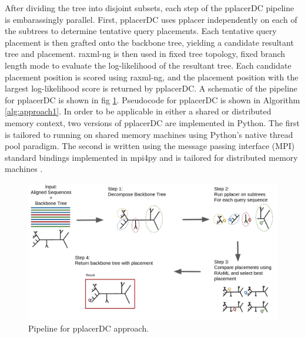\documentclass[10pt]{article}
\begin{document}
After dividing the tree into disjoint subsets, each step of the pplacerDC pipeline
is embarassingly parallel.
First, pplacerDC uses pplacer independently on each of the subtrees to determine tentative
query placements.
Each tentative query placement is then grafted onto the backbone tree, yielding a candidate
resultant tree and placement.
raxml-ng \cite{raxml} is then used in fixed tree topology, fixed branch length mode to evaluate
the log-likelihood of the resultant tree.
Each candidate placement position is scored using raxml-ng, and the placement position
with the largest log-likelihood score is returned by pplacerDC.
A schematic of the pipeline for pplacerDC is shown in fig \ref{fig:pplacerDC-pipeline}.
Pseudocode for pplacerDC is shown in Algorithm \ref{alg:approach1}.
In order to be applicable in either a shared or distributed memory context,
two versions of pplacerDC are implemented in Python.
The first is tailored to running on shared memory machines using Python's
native thread pool paradigm.
The second is written using the message passing interface (MPI) standard
bindings implemented in mpi4py and is tailored for distributed memory machines \cite{mpi4py-paper}.

\begin{figure}[!htb]
\centering
\includegraphics[width=\textwidth]{Figs/pplacerDCpipeline.png}
\caption{Pipeline for pplacerDC approach.}
\label{fig:pplacerDC-pipeline}
\end{figure}
\end{document}
